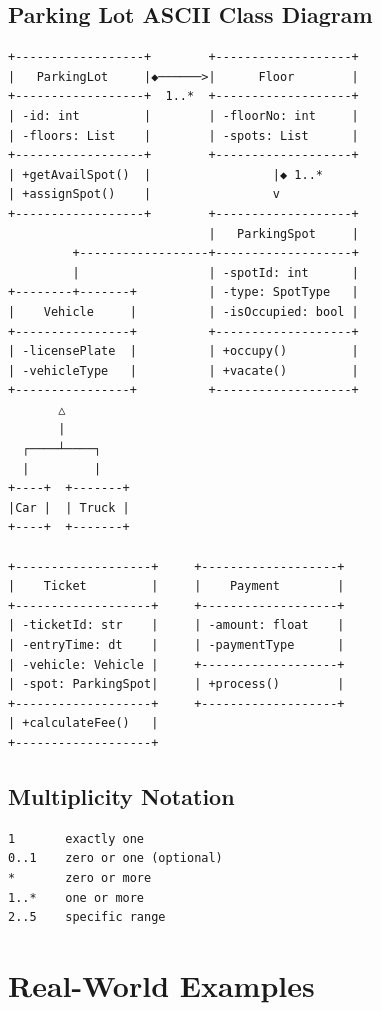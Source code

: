 \documentclass[11pt]{article}
\begin{document}
\subsection{Parking Lot ASCII Class Diagram}\label{parking-lot-ascii-class-diagram}

\setcodelang{}

\begin{verbatim}
+------------------+        +-------------------+
|   ParkingLot     |◆──────>|      Floor        |
+------------------+  1..*  +-------------------+
| -id: int         |        | -floorNo: int     |
| -floors: List    |        | -spots: List      |
+------------------+        +-------------------+
| +getAvailSpot()  |                 |◆ 1..*
| +assignSpot()    |                 v
+------------------+        +-------------------+
                            |   ParkingSpot     |
         +------------------+-------------------+
         |                  | -spotId: int      |
+--------+-------+          | -type: SpotType   |
|    Vehicle     |          | -isOccupied: bool |
+----------------+          +-------------------+
| -licensePlate  |          | +occupy()         |
| -vehicleType   |          | +vacate()         |
+----------------+          +-------------------+
       △
       |
  ┌────┴────┐
  |         |
+----+  +-------+
|Car |  | Truck |
+----+  +-------+

+-------------------+     +-------------------+
|    Ticket         |     |    Payment        |
+-------------------+     +-------------------+
| -ticketId: str    |     | -amount: float    |
| -entryTime: dt    |     | -paymentType      |
| -vehicle: Vehicle |     +-------------------+
| -spot: ParkingSpot|     | +process()        |
+-------------------+     +-------------------+
| +calculateFee()   |
+-------------------+
\end{verbatim}

\subsection{Multiplicity Notation}\label{multiplicity-notation}

\setcodelang{}

\begin{verbatim}
1       exactly one
0..1    zero or one (optional)
*       zero or more
1..*    one or more
2..5    specific range
\end{verbatim}

\section{Real-World Examples}\label{real-world-examples}
\end{document}
